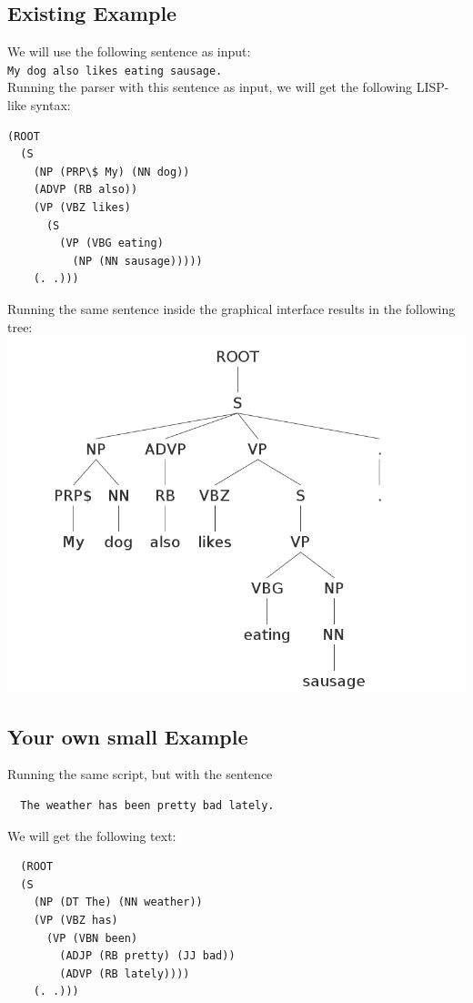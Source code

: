 \documentclass[a4paper,10pt]{article}
\begin{document}
 \subsection{Existing Example}
 We will use the following sentence as input: \\
\verb|My dog also likes eating sausage.| \\
Running the parser with this sentence as input, we will get the following LISP-like syntax: \\
\begin{verbatim}
(ROOT
  (S
    (NP (PRP\$ My) (NN dog))
    (ADVP (RB also))
    (VP (VBZ likes)
      (S
        (VP (VBG eating)
          (NP (NN sausage)))))
    (. .)))
\end{verbatim}
Running the same sentence inside the graphical interface results in the following tree: \\
\includegraphics[scale=0.5]{tree}
 \subsection{Your own small Example}
 Running the same script, but with the sentence
 \begin{verbatim}
  The weather has been pretty bad lately.
 \end{verbatim}
 We will get the following text:
 \begin{verbatim}
  (ROOT
  (S
    (NP (DT The) (NN weather))
    (VP (VBZ has)
      (VP (VBN been)
        (ADJP (RB pretty) (JJ bad))
        (ADVP (RB lately))))
    (. .)))
 \end{verbatim}
\end{document}
